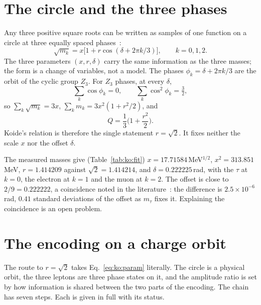 \section{The circle and the three phases}\label{sec:ko:circle}
Any three positive square roots can be written as samples of one function on a circle at three equally spaced phases~\cite{Brannen2006}:
\begin{equation}
\sqrt{m_k}=x\big[1+r\cos(\delta+2\pi k/3)\big],\qquad k=0,1,2.\label{eq:ko:param}
\end{equation}
The three parameters $(x,r,\delta)$ carry the same information as the three masses; the form is a change of variables, not a model.
\derived{} The phases $\phi_k=\delta+2\pi k/3$ are the orbit of the cyclic group $Z_3$. For $Z_3$ phases, at every $\delta$,
\begin{equation}
\sum_k\cos\phi_k=0,\qquad\sum_k\cos^2\phi_k=\tfrac32,\label{eq:ko:Z3}
\end{equation}
so $\sum_k\sqrt{m_k}=3x$, $\sum_km_k=3x^2(1+r^2/2)$, and
\begin{equation}
Q=\frac13\Big(1+\frac{r^2}{2}\Big).\label{eq:ko:Qr}
\end{equation}
\derived{} Koide's relation is therefore the single statement $r=\sqrt2$. It fixes neither the scale $x$ nor the offset $\delta$.

The measured masses give (Table~\ref{tab:ko:fit}) $x=17.71584$\,MeV$^{1/2}$, $x^2=313.851$\,MeV, $r=1.414209$ against $\sqrt2=1.414214$, and
$\delta=0.222225$\,rad, with the $\tau$ at $k=0$, the electron at $k=1$ and the muon at $k=2$. \calc{} The offset is close to $2/9=0.222222$, a
coincidence noted in the literature~\cite{Brannen2006}: the difference is $2.5\times10^{-6}$\,rad, $0.41$ standard deviations of the offset as $m_\tau$
fixes it. \calc{} Explaining the coincidence is an open problem. \openprob

\section{The encoding on a charge orbit}\label{sec:ko:encoding}
The route to $r=\sqrt2$ takes Eq.~\eqref{eq:ko:param} literally. The circle is a physical orbit, the three leptons are three phase states on it, and
the amplitude ratio is set by how information is shared between the two parts of the encoding. The chain has seven steps. Each is given in full
with its status.

